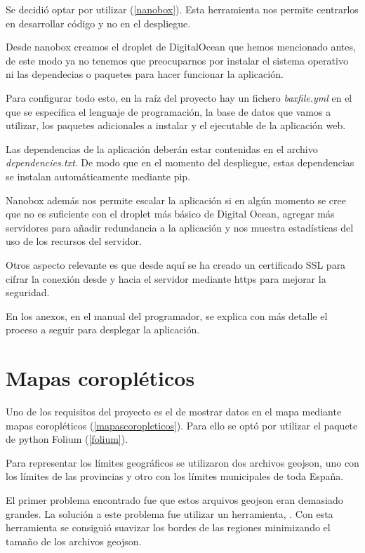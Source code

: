 Se decidió optar por utilizar  (\ref{nanobox}). Esta herramienta nos permite centrarlos en desarrollar código y no en el despliegue.

Desde nanobox creamos el droplet de DigitalOcean que hemos mencionado antes, de este modo ya no tenemos que preocuparnos por instalar el sistema operativo ni las dependecias o paquetes para hacer funcionar la aplicación.

Para configurar todo esto, en la raíz del proyecto hay un fichero \textit{baxfile.yml} en el que se especifica el lenguaje de programación, la base de datos que vamos a utilizar, los paquetes adicionales a instalar y el ejecutable de la aplicación web.

Las dependencias de la aplicación deberán estar contenidas en el archivo \textit{dependencies.txt}. De modo que en el momento del despliegue, estas dependencias se instalan automáticamente mediante pip.

Nanobox además nos permite escalar la aplicación si en algún momento se cree que no es suficiente con el droplet más básico de Digital Ocean, agregar más servidores para añadir redundancia a la aplicación y nos muestra estadísticas del uso de los recursos del servidor.

Otros aspecto relevante es que desde aquí se ha creado un certificado SSL para cifrar la conexión  desde y hacia el servidor mediante https para mejorar la seguridad.

En los anexos, en el manual del programador, se explica con más detalle el proceso a seguir para desplegar la aplicación.

\section{Mapas coropléticos}

Uno de los requisitos del proyecto es el de mostrar datos en el mapa mediante mapas coropléticos (\ref{mapascoropleticos}). Para ello se optó por utilizar el paquete de python Folium (\ref{folium}).

Para representar los límites geográficos se utilizaron dos archivos geojson, uno con los límites de las provincias y otro con los límites municipales de toda España.

El primer problema encontrado fue que estos arquivos geojson eran demasiado grandes. La solución a este problema fue utilizar un herramienta, . Con esta herramienta se consiguió suavizar los bordes de las regiones minimizando el tamaño de los archivos geojson.

